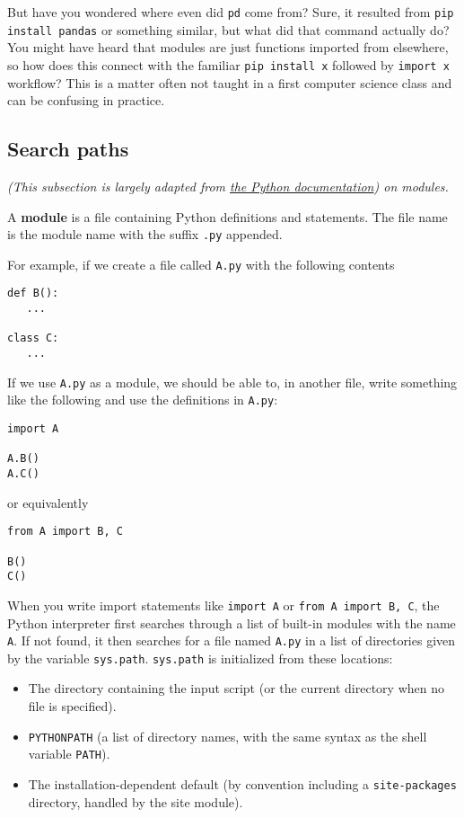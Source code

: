 \documentclass[12pt,letterpaper]{article}
\begin{document}
But have you wondered where even did \texttt{pd} come from? Sure, it resulted from \texttt{pip install pandas} or something similar, but what did that command actually do? You might have heard that modules are just functions imported from elsewhere, so how does this connect with the familiar \texttt{pip install x} followed by \texttt{import x} workflow? This is a matter often not taught in a first computer science class and can be confusing in practice.

\subsection{Search paths}

\textit{(This subsection is largely adapted from \href{https://docs.python.org/3/tutorial/modules.html}{the Python documentation}) on modules.}

A \textbf{module} is a file containing Python definitions and statements. The file name is the module name with the suffix \texttt{.py} appended.

For example, if we create a file called \texttt{A.py} with the following contents

\begin{verbatim}
def B():
   ...

class C:
   ...
\end{verbatim}

If we use \texttt{A.py} as a module, we should be able to, in another file, write something like the following and use the definitions in \texttt{A.py}:

\begin{verbatim}
import A

A.B()
A.C()
\end{verbatim}

or equivalently

\begin{verbatim}
from A import B, C

B()
C()
\end{verbatim}

When you write import statements like \texttt{import A} or \texttt{from A import B, C}, the Python interpreter first searches through a list of built-in modules with the name \texttt{A}. If not found, it then searches for a file named \texttt{A.py} in a list of directories given by the variable \texttt{sys.path}. \texttt{sys.path} is initialized from these locations:

\begin{itemize}
   \item The directory containing the input script (or the current directory when no file is specified).
   \item \texttt{PYTHONPATH} (a list of directory names, with the same syntax as the shell variable \texttt{PATH}).
   \item The installation-dependent default (by convention including a \texttt{site-packages} directory, handled by the site module).
\end{itemize}
\end{document}
